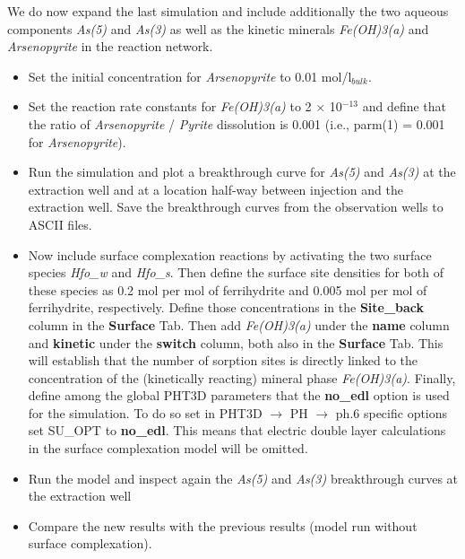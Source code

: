 We do now expand the last simulation and include additionally the two aqueous components 
\emph{As(5)} and \emph{As(3)} as well as the kinetic minerals \emph{Fe(OH)3(a)} and \emph{Arsenopyrite} in the reaction network. 

\begin{itemize}

\item Set the initial concentration for \emph{Arsenopyrite} to 0.01 mol/l$_{bulk}$.

\item Set the reaction rate constants for \emph{Fe(OH)3(a)} to 2 $\times$ 10$^{-13}$
and define that the ratio of \emph{Arsenopyrite} / \emph{Pyrite} dissolution 
is 0.001 (i.e., parm(1) = 0.001 for \emph{Arsenopyrite}).

\item Run the simulation and plot a breakthrough curve for \emph{As(5)} and \emph{As(3)} at the extraction well and at a location half-way between injection and the extraction well.
Save the breakthrough curves from the observation wells to ASCII files.

\item Now include surface complexation reactions by 
activating the two surface species \emph{Hfo\_w} and \emph{Hfo\_s}.
Then define the surface site densities for both of these species as 0.2 mol per mol of ferrihydrite 
and 0.005 mol per mol of ferrihydrite, respectively. Define those concentrations in the {\color{blue} \textbf{Site\_back}} column in the {\color{blue} \textbf{Surface}} Tab. 
Then add \emph{Fe(OH)3(a)} under the {\color{blue} \textbf{name}} 
column and {\color{blue} \textbf{kinetic}} under the {\color{blue} \textbf{switch}} column, 
both also in the {\color{blue} \textbf{Surface}} Tab.  
This will establish that the number of sorption sites is directly 
linked to the concentration of the (kinetically reacting) 
mineral phase \emph{Fe(OH)3(a)}. 
Finally, define among the global PHT3D parameters that the {\color{blue} \textbf{no\_edl}} 
option is used for the simulation.
To do so set in 
{\color{blue}PHT3D} $\rightarrow$ {\color{blue}PH} $\rightarrow$ {\color{blue}ph.6 specific options}
set {\color{red}SU\_OPT} to {\color{blue} \textbf{no\_edl}}. 
This means that electric double layer calculations in the surface complexation 
model will be omitted.  
    

\item Run the model and inspect again the \emph{As(5)} and \emph{As(3)} breakthrough curves at the extraction well

\item Compare the new results with the previous results (model run without surface complexation).

\end{itemize}




